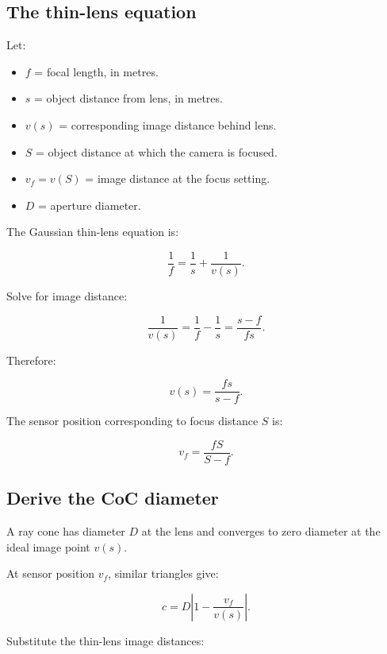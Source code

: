\subsection{The thin-lens equation}\label{02-foundations-ii-ch036-the-thin-lens-equation}

\hypertarget{02-foundations-ii-ch036-the-thin-lens-equation}{}

Let:

\begin{itemize}
\tightlist
\item
  \(f\) = focal length, in metres.
\item
  \(s\) = object distance from lens, in metres.
\item
  \(v(s)\) = corresponding image distance behind lens.
\item
  \(S\) = object distance at which the camera is focused.
\item
  \(v_f=v(S)\) = image distance at the focus setting.
\item
  \(D\) = aperture diameter.
\end{itemize}

The Gaussian thin-lens equation is:

\[ \boxed{ \frac1f=\frac1s+\frac1{v(s)}. } \]

Solve for image distance:

\[ \frac1{v(s)}=\frac1f-\frac1s =\frac{s-f}{fs}. \]

Therefore:

\[ \boxed{ v(s)=\frac{fs}{s-f}. } \]

The sensor position corresponding to focus distance \(S\) is:

\[ \boxed{ v_f=\frac{fS}{S-f}. } \]

\subsection{Derive the CoC diameter}\label{02-foundations-ii-ch036-derive-the-coc-diameter}

\hypertarget{02-foundations-ii-ch036-derive-the-coc-diameter}{}

A ray cone has diameter \(D\) at the lens and converges to zero diameter at the ideal image point \(v(s)\).

At sensor position \(v_f\), similar triangles give:

\[ \boxed{ c=D\left|1-\frac{v_f}{v(s)}\right|. } \]

Substitute the thin-lens image distances:

